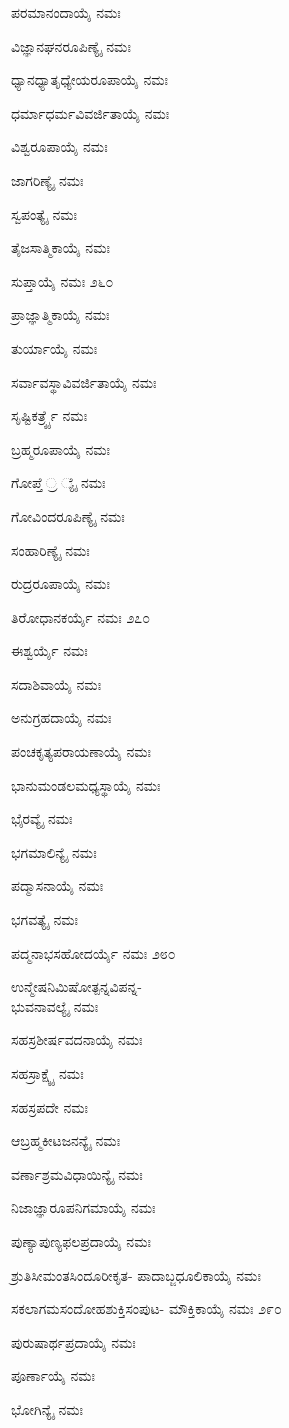 ಪರಮಾನಂದಾಯೈ ನಮಃ

ವಿಜ್ಞಾನಘನರೂಪಿಣ್ಯೈ ನಮಃ

ಧ್ಯಾನಧ್ಯಾತೃಧ್ಯೇಯರೂಪಾಯೈ ನಮಃ

ಧರ್ಮಾಧರ್ಮವಿವರ್ಜಿತಾಯೈ ನಮಃ

ವಿಶ್ವರೂಪಾಯೈ ನಮಃ

ಜಾಗರಿಣ್ಯೈ ನಮಃ

ಸ್ವಪಂತ್ಯೈ ನಮಃ

ತೈಜಸಾತ್ಮಿಕಾಯೈ ನಮಃ

ಸುಪ್ತಾಯೈ ನಮಃ \num{೨೬೦}

ಪ್ರಾಜ್ಞಾತ್ಮಿಕಾಯೈ ನಮಃ

ತುರ್ಯಾಯೈ ನಮಃ

ಸರ್ವಾವಸ್ಥಾವಿವರ್ಜಿತಾಯೈ ನಮಃ

ಸೃಷ್ಟಿಕರ್ತ್ರ್ಯೈ ನಮಃ

ಬ್ರಹ್ಮರೂಪಾಯೈ ನಮಃ

ಗೋಪ್ತೆ ್ರ ್ಯೈ ನಮಃ

ಗೋವಿಂದರೂಪಿಣ್ಯೈ ನಮಃ

ಸಂಹಾರಿಣ್ಯೈ ನಮಃ

ರುದ್ರರೂಪಾಯೈ ನಮಃ

ತಿರೋಧಾನಕರ್ಯೈ ನಮಃ \num{೨೭೦}

ಈಶ್ವರ್ಯೈ ನಮಃ

ಸದಾಶಿವಾಯೈ ನಮಃ

ಅನುಗ್ರಹದಾಯೈ ನಮಃ

ಪಂಚಕೃತ್ಯಪರಾಯಣಾಯೈ ನಮಃ

ಭಾನುಮಂಡಲಮಧ್ಯಸ್ಥಾಯೈ ನಮಃ

ಭೈರವ್ಯೈ ನಮಃ

ಭಗಮಾಲಿನ್ಯೈ ನಮಃ

ಪದ್ಮಾಸನಾಯೈ ನಮಃ

ಭಗವತ್ಯೈ ನಮಃ

ಪದ್ಮನಾಭಸಹೋದರ್ಯೈ ನಮಃ \num{೨೮೦}

ಉನ್ಮೇಷನಿಮಿಷೋತ್ಪನ್ನವಿಪನ್ನ-\\ಭುವನಾವಲ್ಯೈ ನಮಃ

ಸಹಸ್ರಶೀರ್ಷವದನಾಯೈ ನಮಃ

ಸಹಸ್ರಾಕ್ಷ್ಯೈ ನಮಃ

ಸಹಸ್ರಪದೇ ನಮಃ

ಆಬ್ರಹ್ಮಕೀಟಜನನ್ಯೈ ನಮಃ

ವರ್ಣಾಶ್ರಮವಿಧಾಯಿನ್ಯೈ ನಮಃ

ನಿಜಾಜ್ಞಾರೂಪನಿಗಮಾಯೈ ನಮಃ

ಪುಣ್ಯಾಪುಣ್ಯಫಲಪ್ರದಾಯೈ ನಮಃ

ಶ್ರುತಿಸೀಮಂತಸಿಂದೂರೀಕೃತ- ಪಾದಾಬ್ಜಧೂಲಿಕಾಯೈ ನಮಃ

ಸಕಲಾಗಮಸಂದೋಹಶುಕ್ತಿಸಂಪುಟ- ಮೌಕ್ತಿಕಾಯೈ ನಮಃ \num{೨೯೦}

ಪುರುಷಾರ್ಥಪ್ರದಾಯೈ ನಮಃ

ಪೂರ್ಣಾಯೈ ನಮಃ

ಭೋಗಿನ್ಯೈ ನಮಃ

